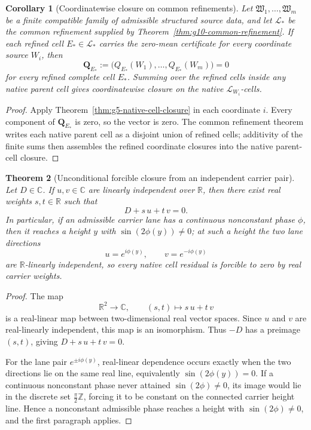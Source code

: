 \documentclass[11pt]{article}
\newtheorem{theorem}{Theorem}
\newtheorem{corollary}[theorem]{Corollary}
\theoremstyle{definition}
\begin{document}
\begin{corollary}[Coordinatewise closure on common refinements]\label{cor:g5-refined-coordinate-closure}
Let \(\mathfrak W_1,\ldots,\mathfrak W_m\) be a finite compatible family of
admissible structured source data, and let \(\mathcal L_*\) be the common
refinement supplied by Theorem~\ref{thm:g10-common-refinement}.  If each
refined cell \(E_*\in\mathcal L_*\) carries the zero-mean certificate for every
coordinate source \(W_i\), then
\[
\mathbf Q_{E_*}:=
\bigl(Q_{E_*}(W_1),\ldots,Q_{E_*}(W_m)\bigr)=0
\]
for every refined complete cell \(E_*\).  Summing over the refined cells inside
any native parent cell gives coordinatewise closure on the native
\(\mathcal L_{W_i}\)-cells.
\end{corollary}

\begin{proof}
Apply Theorem~\ref{thm:g5-native-cell-closure} in each coordinate \(i\).  Every
component of \(\mathbf Q_{E_*}\) is zero, so the vector is zero.  The common
refinement theorem writes each native parent cell as a disjoint union of
refined cells; additivity of the finite sums then assembles the refined
coordinate closures into the native parent-cell closure.
\end{proof}

\begin{theorem}[Unconditional forcible closure from an independent carrier pair]\label{thm:g5-forcible-independent-pair}
Let \(D\in\mathbb C\).  If \(u,v\in\mathbb C\) are linearly independent over
\(\mathbb R\), then there exist real weights \(s,t\in\mathbb R\) such that
\[
D+s\,u+t\,v=0.
\]
In particular, if an admissible carrier lane has a continuous nonconstant
phase \(\phi\), then it reaches a height \(y\) with
\(\sin(2\phi(y))\ne0\); at such a height the two lane directions
\[
u=e^{i\phi(y)},\qquad v=e^{-i\phi(y)}
\]
are \(\mathbb R\)-linearly independent, so every native cell residual is
forcible to zero by real carrier weights.
\end{theorem}

\begin{proof}
The map
\[
\mathbb R^2\to\mathbb C,\qquad (s,t)\mapsto s\,u+t\,v
\]
is a real-linear map between two-dimensional real vector spaces.  Since
\(u\) and \(v\) are real-linearly independent, this map is an isomorphism.
Thus \(-D\) has a preimage \((s,t)\), giving \(D+s\,u+t\,v=0\).

For the lane pair \(e^{\pm i\phi(y)}\), real-linear dependence occurs exactly
when the two directions lie on the same real line, equivalently
\(\sin(2\phi(y))=0\).  If a continuous nonconstant phase never attained
\(\sin(2\phi)\ne0\), its image would lie in the discrete set
\(\frac{\pi}{2}\mathbb Z\), forcing it to be constant on the connected carrier
height line.  Hence a nonconstant admissible phase reaches a height with
\(\sin(2\phi)\ne0\), and the first paragraph applies.
\end{proof}
\end{document}
